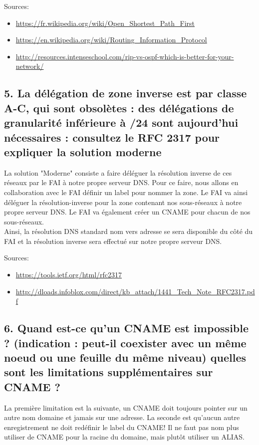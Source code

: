 \documentclass{article}
\begin{document}
Sources:
\begin{itemize}
\item \url{https://fr.wikipedia.org/wiki/Open_Shortest_Path_First}
\item \url{https://en.wikipedia.org/wiki/Routing_Information_Protocol}
\item \url{http://resources.intenseschool.com/rip-vs-ospf-which-is-better-for-your-network/}
\end{itemize}

\subsection*{5. La délégation de zone inverse est par classe A-C, qui sont obsolètes : des délégations de granularité inférieure à /24 sont aujourd’hui nécessaires : consultez le RFC 2317 pour expliquer la solution moderne}
La solution "Moderne" consiste a faire déléguer la résolution inverse de ces réseaux par le FAI à notre propre serveur DNS. Pour ce faire, nous allons en collaboration avec le FAI définir un label pour nommer la zone. Le FAI va ainsi déléguer la résolution-inverse pour la zone contenant nos sous-réseaux à notre propre serveur DNS. Le FAI va également créer un CNAME pour chacun de nos sous-réseaux.\\

Ainsi, la résolution DNS standard nom vers adresse se sera disponible du côté du FAI et la résolution inverse sera effectué sur notre propre serveur DNS.

Sources:
\begin{itemize}
\item \url{https://tools.ietf.org/html/rfc2317}
\item \url{http://dloads.infoblox.com/direct/kb_attach/1441_Tech_Note_RFC2317.pdf}
\end{itemize}

\subsection*{6. Quand est-ce qu’un CNAME est impossible ? (indication : peut-il coexister avec un même noeud ou une feuille du même niveau) quelles sont les limitations supplémentaires sur CNAME ?}
La première limitation est la suivante, un CNAME doit toujours pointer sur un autre nom domaine et jamais sur une adresse. La seconde est qu'aucun autre enregistrement ne doit redéfinir le label du CNAME! Il ne faut pas nom plus utiliser de CNAME pour la racine du domaine, mais plutôt utiliser un ALIAS.\\
\end{document}
